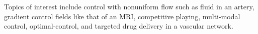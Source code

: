 Topics of interest include control with nonuniform flow such as fluid in an artery, gradient control fields like that of an MRI, competitive playing, multi-modal control, optimal-control, and targeted drug delivery in a vascular network.


%  





